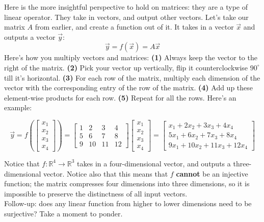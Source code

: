 \documentclass{article}
\begin{document}
Here is the more insightful perspective to hold on matrices: they are a type of linear operator. They take in vectors, and output other vectors. Let's take our matrix $A$ from earlier, and create a function out of it. It takes in a vector $\vec{x}$ and outputs a vector $\vec{y}$:
\[\vec{y} = f(\vec{x}) = A\vec{x}\]
Here's how you multiply vectors and matrices: \textbf{(1)} Always keep the vector to the right of the matrix. \textbf{(2)} Pick your vector up vertically, flip it counterclockwise $90^{\circ}$ till it's horizontal. \textbf{(3)} For each row of the matrix, multiply each dimension of the vector with the corresponding entry of the row of the matrix. \textbf{(4)} Add up these element-wise products for each row. \textbf{(5)} Repeat for all the rows. Here's an example:

\begin{equation*}\vec{y} = f\left(\begin{bmatrix} x_1 \\ x_2 \\ x_3 \\ x_4\end{bmatrix}\right) = \begin{bmatrix}
    1 & 2 & 3 & 4 \\
    5 & 6 & 7 & 8 \\
    9 & 10 & 11 & 12 \end{bmatrix}\begin{bmatrix} x_1 \\ x_2 \\ x_3 \\ x_4\end{bmatrix} = \begin{bmatrix}
    x_1 + 2x_2 + 3x_3 + 4x_4 \\
    5x_1 + 6x_2 + 7x_3 + 8x_4 \\
    9x_1 + 10x_2 + 11x_3 + 12x_4 \end{bmatrix}\end{equation*}

Notice that $f: \mathbb{R}^4 \to \mathbb{R}^3$ takes in a four-dimensional vector, and outputs a three-dimensional vector. Notice also that this means that $f$ \textbf{cannot} be an injective function; the matrix compresses four dimensions into three dimensions, so it is impossible to preserve the distinctness of all input vectors. \\

Follow-up: does any linear function from higher to lower dimensions need to be surjective? Take a moment to ponder. \\
\end{document}
